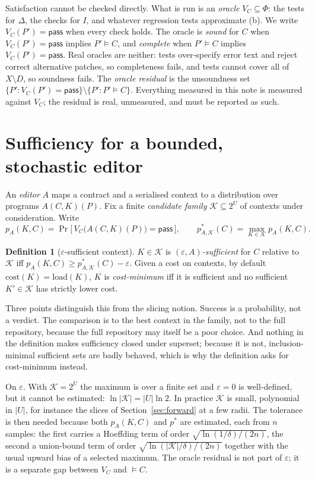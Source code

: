 \documentclass[10pt]{article}
\theoremstyle{definition}
\newtheorem{definition}{Definition}
\theoremstyle{plain}
\theoremstyle{remark}
\newcommand{\pass}{\mathsf{pass}}
\newcommand{\eps}{\varepsilon}
\newcommand{\Kfam}{\mathcal{K}}
\begin{document}
Satisfaction cannot be checked directly. What is run is an \emph{oracle} $V_C \subseteq \Phi$: the tests for $\Delta$, the checks for $I$, and whatever regression tests approximate (b). We write $V_C(P') = \pass$ when every check holds. The oracle is \emph{sound} for $C$ when $V_C(P') = \pass$ implies $P' \models C$, and \emph{complete} when $P' \models C$ implies $V_C(P') = \pass$. Real oracles are neither: tests over-specify error text and reject correct alternative patches, so completeness fails, and tests cannot cover all of $X \setminus D$, so soundness fails. The \emph{oracle residual} is the unsoundness set $\{P' : V_C(P') = \pass\} \setminus \{P' : P' \models C\}$. Everything measured in this note is measured against $V_C$; the residual is real, unmeasured, and must be reported as such.

\section{Sufficiency for a bounded, stochastic editor}

An \emph{editor} $A$ maps a contract and a serialised context to a distribution over programs $A(C,K)(P)$. Fix a finite \emph{candidate family} $\Kfam \subseteq 2^U$ of contexts under consideration. Write
\[
p_A(K, C) = \Pr\big[\, V_C\big(A(C,K)(P)\big) = \pass \,\big],
\qquad
p^*_{A,\Kfam}(C) = \max_{K \in \Kfam} p_A(K, C).
\]

\begin{definition}[$\eps$-sufficient context]\label{def:suff}
$K \in \Kfam$ is \emph{$(\eps, A)$-sufficient} for $C$ relative to $\Kfam$ iff $p_A(K, C) \geq p^*_{A,\Kfam}(C) - \eps$. Given a cost on contexts, by default $\mathrm{cost}(K) = \mathrm{load}(K)$, $K$ is \emph{cost-minimum} iff it is sufficient and no sufficient $K' \in \Kfam$ has strictly lower cost.
\end{definition}

Three points distinguish this from the slicing notion. Success is a probability, not a verdict. The comparison is to the best context in the family, not to the full repository, because the full repository may itself be a poor choice. And nothing in the definition makes sufficiency closed under superset; because it is not, inclusion-minimal sufficient sets are badly behaved, which is why the definition asks for cost-minimum instead.

On $\eps$. With $\Kfam = 2^U$ the maximum is over a finite set and $\eps = 0$ is well-defined, but it cannot be estimated: $\ln|\Kfam| = |U|\ln 2$. In practice $\Kfam$ is small, polynomial in $|U|$, for instance the slices of Section~\ref{sec:forward} at a few radii. The tolerance is then needed because both $p_A(K,C)$ and $p^*$ are estimated, each from $n$ samples: the first carries a Hoeffding term of order $\sqrt{\ln(1/\delta)/(2n)}$, the second a union-bound term of order $\sqrt{\ln(|\Kfam|/\delta)/(2n)}$ together with the usual upward bias of a selected maximum. The oracle residual is not part of $\eps$; it is a separate gap between $V_C$ and $\models C$.
\end{document}
